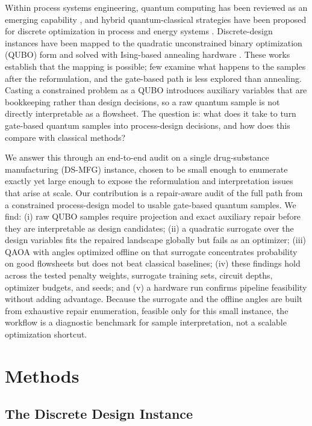 \documentclass[10pt,letterpaper]{article}
\begin{document}
Within process systems engineering, quantum computing has been reviewed as an emerging capability \cite{BernalAIChE2022}, and hybrid quantum-classical strategies have been proposed for discrete optimization in process and energy systems \cite{AjagekarYou2019}.
Discrete-design instances have been mapped to the quadratic unconstrained binary optimization (QUBO) form \cite{glover2019} and solved with Ising-based annealing hardware \cite{AjagekarYou2019,park2026arxiv}.
These works establish that the mapping is possible; few examine what happens to the samples after the reformulation, and the gate-based path is less explored than annealing.
Casting a constrained problem as a QUBO introduces auxiliary variables \cite{toqubo:2023} that are bookkeeping rather than design decisions, so a raw quantum sample is not directly interpretable as a flowsheet.
The question is: what does it take to turn gate-based quantum samples into process-design decisions, and how does this compare with classical methods?

We answer this through an end-to-end audit on a single drug-substance manufacturing (DS-MFG) instance, chosen to be small enough to enumerate exactly yet large enough to expose the reformulation and interpretation issues that arise at scale.
Our contribution is a repair-aware audit of the full path from a constrained process-design model to usable gate-based quantum samples.
We find:
(i) raw QUBO samples require projection and exact auxiliary repair before they are interpretable as design candidates;
(ii) a quadratic surrogate over the design variables fits the repaired landscape globally but fails as an optimizer;
(iii) QAOA with angles optimized offline on that surrogate concentrates probability on good flowsheets but does not beat classical baselines;
(iv) these findings hold across the tested penalty weights, surrogate training sets, circuit depths, optimizer budgets, and seeds; and
(v) a hardware run confirms pipeline feasibility without adding advantage.
Because the surrogate and the offline angles are built from exhaustive repair enumeration, feasible only for this small instance, the workflow is a diagnostic benchmark for sample interpretation, not a scalable optimization shortcut.

\section{Methods}
\label{sec:ds-mfg-methods}

\subsection{The Discrete Design Instance}
\label{subsec:ds-mfg-instance}
\end{document}
